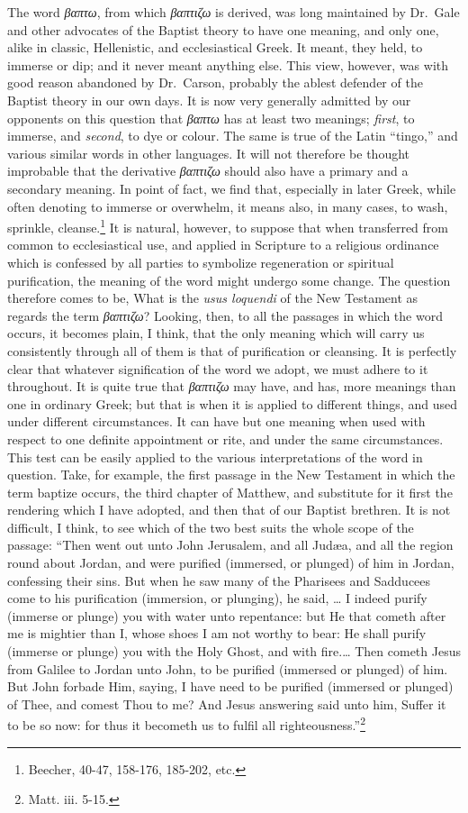 \documentclass[english,]{book}
\begin{document}
The word \emph{βαπτω}, from which \emph{βαπτιζω} is derived, was long maintained by Dr.~Gale and other advocates of the Baptist theory to have one meaning, and only one, alike in classic, Hellenistic, and ecclesiastical Greek. It meant, they held, to immerse or dip; and it never meant anything else. This view, however, was with good reason abandoned by Dr.~Carson, probably the ablest defender of the Baptist theory in our own days. It is now very generally admitted by our opponents on this question that \emph{βαπτω} has at least two meanings; \emph{first}, to immerse, and \emph{second}, to dye or colour. The same is true of the Latin ``tingo,'' and various similar words in other languages. It will not therefore be thought improbable that the derivative \emph{βαπτιζω} should also have a primary and a secondary meaning. In point of fact, we find that, especially in later Greek, while often denoting to immerse or overwhelm, it means also, in many cases, to wash, sprinkle, cleanse.\footnote{Beecher, 40-47, 158-176, 185-202, etc.} It is natural, however, to suppose that when transferred from common to ecclesiastical use, and applied in Scripture to a religious ordinance which is confessed by all parties to symbolize regeneration or spiritual purification, the meaning of the word might undergo some change. The question therefore comes to be, What is the \emph{usus loquendi} of the New Testament as regards the term \emph{βαπτιζω}? Looking, then, to all the passages in which the word occurs, it becomes plain, I think, that the only meaning which will carry us consistently through all of them is that of purification or cleansing. It is perfectly clear that whatever signification of the word we adopt, we must adhere to it throughout. It is quite true that \emph{βαπτιζω} may have, and has, more meanings than one in ordinary Greek; but that is when it is applied to different things, and used under different circumstances. It can have but one meaning when used with respect to one definite appointment or rite, and under the same circumstances. This test can be easily applied to the various interpretations of the word in question. Take, for example, the first passage in the New Testament in which the term baptize occurs, the third chapter of Matthew, and substitute for it first the rendering which I have adopted, and then that of our Baptist brethren. It is not difficult, I think, to see which of the two best suits the whole scope of the passage: ``Then went out unto John Jerusalem, and all Judæa, and all the region round about Jordan, and were purified (immersed, or plunged) of him in Jordan, confessing their sins. But when he saw many of the Pharisees and Sadducees come to his purification (immersion, or plunging), he said, \ldots{} I indeed purify (immerse or plunge) you with water unto repentance: but He that cometh after me is mightier than I, whose shoes I am not worthy to bear: He shall purify (immerse or plunge) you with the Holy Ghost, and with fire.\ldots{} Then cometh Jesus from Galilee to Jordan unto John, to be purified (immersed or plunged) of him. But John forbade Him, saying, I have need to be purified (immersed or plunged) of Thee, and comest Thou to me? And Jesus answering said unto him, Suffer it to be so now: for thus it becometh us to fulfil all righteousness.''\footnote{Matt. iii. 5-15.}
\end{document}
